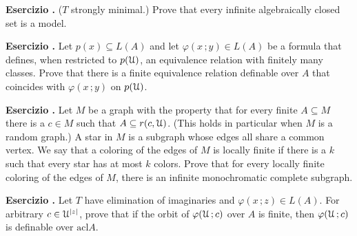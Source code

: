 \documentclass[10pt]{article}
\def\phi{\varphi}
\def\U{\EuScript U}
\def\acl{\textrm{acl}}
\newcounter{ex}
\newenvironment{exercise}{\addtocounter{ex}{1}\textbf{Esercizio \theex.\quad}}{}
\begin{document}
\begin{exercise}\label{ex_infinite_acl}
  ($T$ strongly minimal.) Prove that every infinite algebraically closed set is a model.
\end{exercise}


\begin{exercise}
  Let $p(x)\subseteq L(A)$ and let $\phi(x\,;y)\in L(A)$ be a formula that defines, when restricted to $p(\U)$, an equivalence relation with finitely many classes.
  Prove that there is a finite equivalence relation definable over $A$ that coincides with $\phi(x\,;y)$ on $p(\U)$.
\end{exercise}

\begin{exercise}
  Let $M$ be a graph with the property that for every finite $A\subseteq M$ there is a $c\in M$ such that $A\subseteq r(c,\U)$. 
  (This holds in particular when $M$ is a random graph.)
  A star in $M$ is a subgraph whose edges all share a common vertex. We say that a coloring of the edges of $M$ is locally finite if there is a $k$ such that every star has at most $k$ colors.
  Prove that for every locally finite coloring of the edges of $M$, there is an infinite monochromatic complete subgraph.
\end{exercise}


\begin{exercise}
  Let $T$ have elimination of imaginaries and $\phi(x\,;z)\in L(A)$.
  For arbitrary $c\in\U^{|z|}$, prove that if the orbit of $\phi(\U\,; c)$ over $A$ is finite, then $\phi(\U\,; c)$ is definable over $\acl A$.
  \end{exercise}
\end{document}

